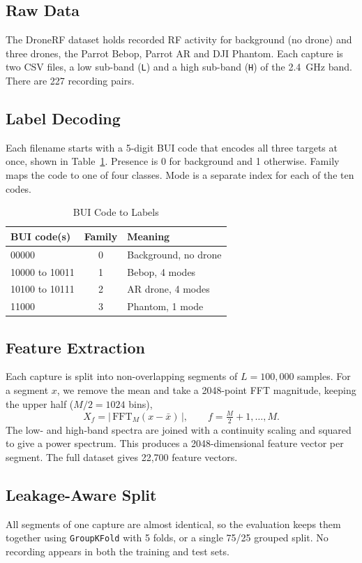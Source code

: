 \documentclass[11pt,conference,a4paper]{IEEEtran}
\begin{document}
\subsection{Raw Data}
The DroneRF dataset holds recorded RF activity for background (no drone) and
three drones, the Parrot Bebop, Parrot AR and DJI Phantom. Each capture is two
CSV files, a low sub-band (\texttt{L}) and a high sub-band (\texttt{H}) of the
2.4~GHz band. There are 227 recording pairs.

\subsection{Label Decoding}
Each filename starts with a 5-digit BUI code that encodes all three targets at
once, shown in Table~\ref{tab:bui}. Presence is 0 for background and 1
otherwise. Family maps the code to one of four classes. Mode is a separate index
for each of the ten codes.

\begin{table}[t]
\centering
\caption{BUI Code to Labels}
\label{tab:bui}
\small
\begin{tabular}{|l|c|p{3.2cm}|}
\hline
\textbf{BUI code(s)} & \textbf{Family} & \textbf{Meaning} \\
\hline
00000 & 0 & Background, no drone \\
\hline
10000 to 10011 & 1 & Bebop, 4 modes \\
\hline
10100 to 10111 & 2 & AR drone, 4 modes \\
\hline
11000 & 3 & Phantom, 1 mode \\
\hline
\end{tabular}
\end{table}

\subsection{Feature Extraction}
Each capture is split into non-overlapping segments of $L = 100{,}000$ samples.
For a segment $x$, we remove the mean and take a 2048-point FFT magnitude,
keeping the upper half ($M/2 = 1024$ bins),
\[
X_f = \big|\,\mathrm{FFT}_{M}(x - \bar{x})\,\big|,\qquad
f = \tfrac{M}{2}+1,\dots,M.
\]
The low- and high-band spectra are joined with a continuity scaling and squared
to give a power spectrum. This produces a 2048-dimensional feature vector per
segment. The full dataset gives 22{,}700 feature vectors.

\subsection{Leakage-Aware Split}
All segments of one capture are almost identical, so the evaluation keeps them
together using \texttt{GroupKFold} with 5 folds, or a single 75/25 grouped
split. No recording appears in both the training and test sets.
\end{document}
